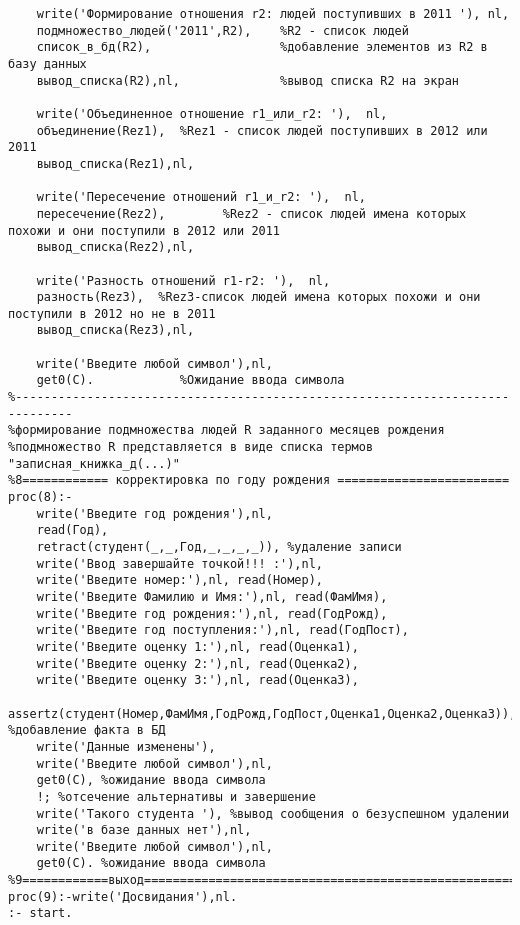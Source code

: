 \documentclass[a4paper,14pt]{extarticle}
\begin{document}
\begin{lstlisting}
    write('Формирование отношения r2: людей поступивших в 2011 '), nl,
    подмножество_людей('2011',R2),    %R2 - список людей
    список_в_бд(R2),                  %добавление элементов из R2 в базу данных
    вывод_списка(R2),nl,              %вывод списка R2 на экран

    write('Объединенное отношение r1_или_r2: '),  nl,
    объединение(Rez1),  %Rez1 - список людей поступивших в 2012 или 2011
    вывод_списка(Rez1),nl,

    write('Пересечение отношений r1_и_r2: '),  nl,
    пересечение(Rez2),        %Rez2 - список людей имена которых похожи и они поступили в 2012 или 2011
    вывод_списка(Rez2),nl,

    write('Разность отношений r1-r2: '),  nl,
    разность(Rez3),  %Rez3-список людей имена которых похожи и они  поступили в 2012 но не в 2011
    вывод_списка(Rez3),nl,

    write('Введите любой символ'),nl,
    get0(C).            %Ожидание ввода символа
%------------------------------------------------------------------------------
%формирование подмножества людей R заданного месяцев рождения
%подмножество R представляется в виде списка термов "записная_книжка_д(...)"
%8============ корректировка по году рождения ========================
proc(8):-
    write('Введите год рождения'),nl,
    read(Год),
    retract(студент(_,_,Год,_,_,_,_)), %удаление записи
    write('Ввод завершайте точкой!!! :'),nl,
    write('Введите номер:'),nl, read(Номер),
    write('Введите Фамилию и Имя:'),nl, read(ФамИмя),
    write('Введите год рождения:'),nl, read(ГодРожд),
    write('Введите год поступления:'),nl, read(ГодПост),
    write('Введите оценку 1:'),nl, read(Оценка1),
    write('Введите оценку 2:'),nl, read(Оценка2),
    write('Введите оценку 3:'),nl, read(Оценка3),
    assertz(студент(Номер,ФамИмя,ГодРожд,ГодПост,Оценка1,Оценка2,Оценка3)), %добавление факта в БД
    write('Данные изменены'),
    write('Введите любой символ'),nl,
    get0(C), %ожидание ввода символа
    !; %отсечение альтернативы и завершение
    write('Такого студента '), %вывод сообщения о безуспешном удалении
    write('в базе данных нет'),nl,
    write('Введите любой символ'),nl,
    get0(C). %ожидание ввода символа
%9============выход============================================================
proc(9):-write('Досвидания'),nl.
:- start.
\end{lstlisting}
\end{document}
